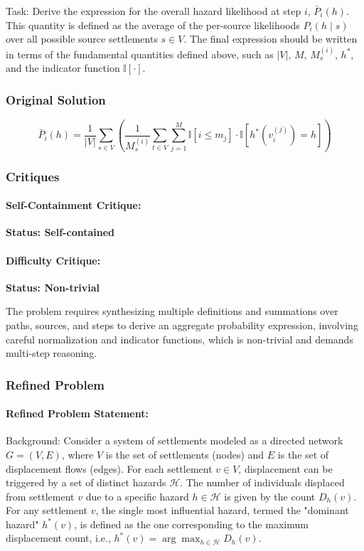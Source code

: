 \documentclass[10pt]{article}
\begin{document}
Task:
Derive the expression for the overall hazard likelihood at step $i$, $\bar{P}_i(h)$. This quantity is defined as the average of the per-source likelihoods $P_i(h \mid s)$ over all possible source settlements $s \in V$. The final expression should be written in terms of the fundamental quantities defined above, such as $|V|$, $M$, $M_s^{(i)}$, $h^*$, and the indicator function $\mathbb{I}[\cdot]$.

\subsubsection*{Original Solution}
\[ \bar{P}_i(h) = \frac{1}{|V|} \sum_{s \in V} \left( \frac{1}{M_s^{(i)}} \sum_{t \in V} \sum_{j=1}^{M} \mathbb{I}[i \leq m_j] \cdot \mathbb{I}[h^*(v^{(j)}_i) = h] \right) \]

\subsubsection*{Critiques}
\paragraph*{Self-Containment Critique:}
\textcolor{pass}{\textbf{Status: Self-contained}}




\paragraph*{Difficulty Critique:}
\textcolor{pass}{\textbf{Status: Non-trivial}}

The problem requires synthesizing multiple definitions and summations over paths, sources, and steps to derive an aggregate probability expression, involving careful normalization and indicator functions, which is non-trivial and demands multi-step reasoning.


\subsubsection*{Refined Problem}
\paragraph*{Refined Problem Statement:}
Background:
Consider a system of settlements modeled as a directed network $G=(V,E)$, where $V$ is the set of settlements (nodes) and $E$ is the set of displacement flows (edges). For each settlement $v \in V$, displacement can be triggered by a set of distinct hazards $\mathcal{H}$. The number of individuals displaced from settlement $v$ due to a specific hazard $h \in \mathcal{H}$ is given by the count $D_h(v)$. For any settlement $v$, the single most influential hazard, termed the "dominant hazard" $h^*(v)$, is defined as the one corresponding to the maximum displacement count, i.e., $h^*(v) = \arg\max_{h \in \mathcal{H}} D_h(v)$.
\end{document}
